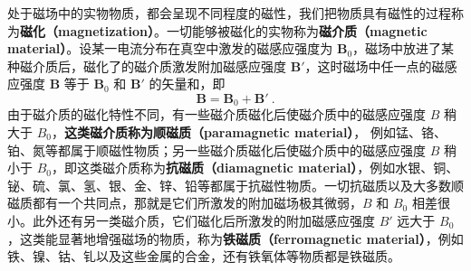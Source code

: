 
处于磁场中的实物物质，都会呈现不同程度的磁性，我们把物质具有磁性的过程称为\textbf{磁化（magnetization）}。一切能够被磁化的实物称为\textbf{磁介质（magnetic material）}。设某一电流分布在真空中激发的磁感应强度为 $\mathbf B_0$，磁场中放进了某种磁介质后，磁化了的磁介质激发附加磁感应强度 $\mathbf B'$，这时磁场中任一点的磁感应强度 $\mathbf B $ 等于 $\mathbf B_0$ 和 $\mathbf B'$ 的矢量和，即
\begin{equation}
\mathbf B=\mathbf B_0+\mathbf B'~.
\end{equation}
由于磁介质的磁化特性不同，有一些磁介质磁化后使磁介质中的磁感应强度 $B$ 稍大于 $B_0$，\textbf{这类磁介质称为顺磁质（paramagnetic material）}， 例如锰、铬、铂、氮等都属于顺磁性物质；另一些磁介质磁化后使磁介质中的磁感应强度 $B$ 稍小于 $B_0$，即这类磁介质称为\textbf{抗磁质（diamagnetic material）}，例如水银、铜、铋、硫、氯、氢、银、金、锌、铅等都属于抗磁性物质。一切抗磁质以及大多数顺磁质都有一个共同点，那就是它们所激发的附加磁场极其微弱，$B$ 和 $B_0$ 相差很小。此外还有另一类磁介质，它们磁化后所激发的附加磁感应强度 $B'$ 远大于 $B_0$，这类能显著地增强磁场的物质，称为\textbf{铁磁质（ferromagnetic material）}，例如铁、镍、钴、钆以及这些金属的合金，还有铁氧体等物质都是铁磁质。